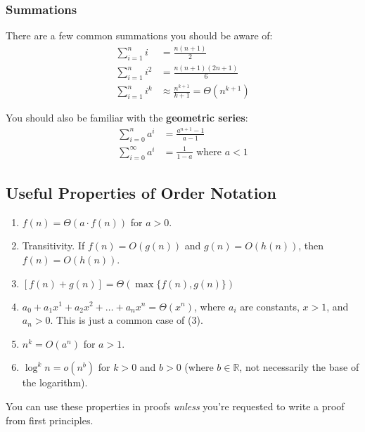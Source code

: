 \documentclass[]{article}
\theoremstyle{definition}
\begin{document}
			\subsubsection{Summations}
				There are a few common summations you should be aware of:
				\begin{align*}
					\sum_{i = 1}^{n} i &= \frac{n(n+1)}{2} \\
					\sum_{i = 1}^{n} i^2 &= \frac{n(n+1)(2n+1)}{6} \\
					\sum_{i = 1}^{n} i^k &\approx \frac{n^{k + 1}}{k + 1} = \Theta(n^{k + 1})
				\end{align*}

				You should also be familiar with the \textbf{geometric series}:
				\begin{align*}
					\sum_{i = 0}^{n} a^i &= \frac{a^{n + 1} - 1}{a - 1} \\
					\sum_{i = 0}^{\infty} a^i &= \frac{1}{1 - a} \text{ where } a < 1
				\end{align*}
		\subsection{Useful Properties of Order Notation}
			\begin{enumerate}
				\item $f(n) = \Theta(a \cdot f(n))$ for $a > 0$.
				\item Transitivity. If $f(n) = O(g(n))$ and $g(n) = O(h(n))$, then $f(n) = O(h(n))$.
				\item $[f(n) + g(n)] = \Theta(\max\{ f(n), g(n) \})$
				\item $a_0 + a_1 x^1 + a_2 x^2 + \ldots + a_n x^n = \Theta(x^n)$, where $a_i$ are constants, $x > 1$, and $a_n > 0$. This is just a common case of (3).
				\item $n^k = O(a^n)$ for $a > 1$.
				\item $\log^{k} n = o(n^b)$ for $k > 0$ and $b > 0$ (where $b \in \mathbb{R}$, not necessarily the base of the logarithm).
			\end{enumerate}

			You can use these properties in proofs \emph{unless} you're requested to write a proof from first principles.
\end{document}
